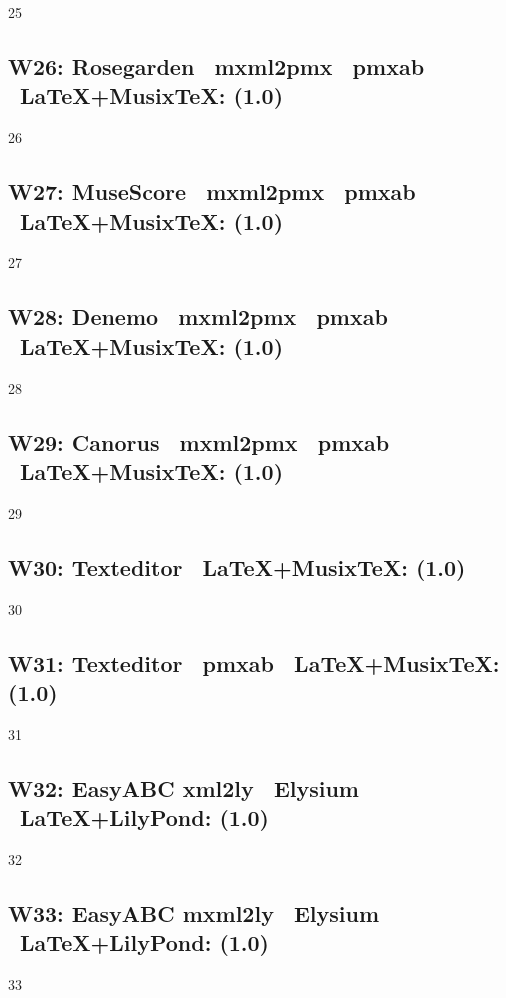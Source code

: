 25

\subsection{W26: Rosegarden \ra\ mxml2pmx \ra\ pmxab \ra\ \LaTeX+Musix\TeX: (1.0)}

26

\subsection{W27: MuseScore \ra\ mxml2pmx \ra\ pmxab \ra\ \LaTeX+Musix\TeX: (1.0)}

27

\subsection{W28: Denemo \ra\ mxml2pmx \ra\ pmxab \ra\ \LaTeX+Musix\TeX: (1.0)} 

28

\subsection{W29: Canorus \ra\ mxml2pmx \ra\ pmxab \ra\ \LaTeX+Musix\TeX: (1.0)} 

29

\subsection{W30: Texteditor \ra\ \LaTeX+Musix\TeX: (1.0)}

30

\subsection{W31: Texteditor \ra\ pmxab \ra\ \LaTeX+Musix\TeX: (1.0)}

31

\subsection{W32: Easy\-ABC \ra xml2ly \ra\ Elysium \ra\ \LaTeX+LilyPond: (1.0)} 

32

\subsection{W33: Easy\-ABC \ra mxml2ly \ra\ Elysium \ra\ \LaTeX+LilyPond: (1.0)} 

33

